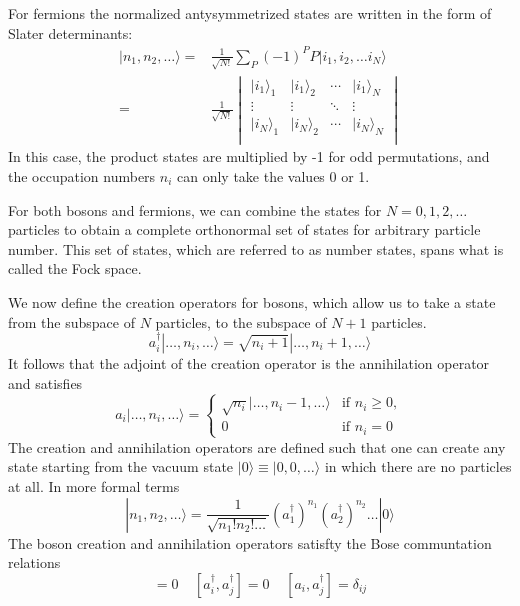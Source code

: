 \documentclass[11pt,letter]{article}
\begin{document}
For fermions the normalized antysymmetrized states are written in the form of Slater determinants:
\begin{equation}
\begin{split}
  | n_{1},  n_{2}, \ldots \rangle = &
  \frac{1}{\sqrt{N!}} \sum_{P} (- 1)^{P} P | i_{1},  i_{2}, \ldots i_{N} \rangle \\
  = &
  \frac{1}{\sqrt{N!}}
  \begin{vmatrix}
  |i_{1}\rangle_{1} & |i_{1}\rangle_{2} & \dotsm & |i_{1}\rangle_{N} \\
  \vdots &  \vdots &  \ddots   & \vdots \\
  |i_{N}\rangle_{1} & |i_{N}\rangle_{2} & \dotsm & |i_{N}\rangle_{N} \\
\end{vmatrix}
\end{split} 
  \label{eq:antisymmetrize} 
\end{equation}  
In this case, the product states are multiplied by -1 for odd permutations, and the occupation numbers $n_{i}$ can only take the values 0 or 1. 

For both bosons and fermions, we can combine the states for $N=0,1,2,\ldots$ particles to
obtain a complete orthonormal set of states for arbitrary particle number.
This set of states, which are referred to as number states, spans what is called the Fock space.   

We now define the 
creation  operators for bosons, which allow us to take a state from the
subspace of $N$ particles, to the subspace of $N+1$  particles. 
\begin{equation}
 a_{i}^{\dagger} | \ldots, n_{i}, \ldots \rangle  = \sqrt{n_{i}+1}|\ldots, n_{i}+1, \dots\rangle
\end{equation}
It follows that the adjoint of the creation operator is the annihilation operator and satisfies
\begin{equation}
a_{i} | \ldots, n_{i}, \ldots \rangle  
=\begin{cases}
\sqrt{n_{i}}|\ldots, n_{i}-1, \dots\rangle
& \text{if $n_{i}\geq 0$},\\
0 & \text{if $n_{i}=0$}
\end{cases}
\end{equation}
The creation and annihilation operators are defined such that one can create any state
starting from the vacuum state $|0\rangle \equiv |0,0,\ldots\rangle$ in which
there are no particles at all.  In more formal terms 
\begin{equation}
  | n_{1}, n_{2}, \dots \rangle = \frac{1}{\sqrt{n_{1}!n_{2}!\ldots}} 
   ( a_{1}^{\dagger} ) ^{n_{1}}  
   ( a_{2}^{\dagger} ) ^{n_{2}}  \ldots | 0 \rangle
  \label{eq:numberstate}
\end{equation}
The boson creation and annihilation operators satisfty the Bose communtation relations
\begin{equation}
  [a_{i}, a_{j}] = 0 \ \ \ \ \  [a_{i}^{\dagger}, a_{j}^{\dagger}] = 0 \ \ \ \ \   [a_{i},a_{j}^{\dagger}]=\delta_{ij}
\end{equation}
\end{document}
